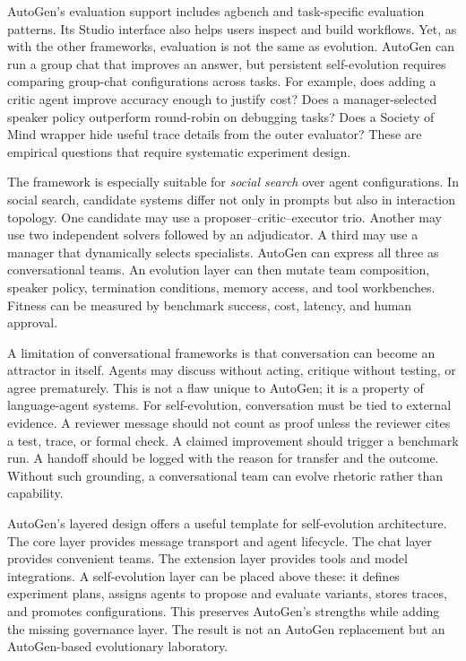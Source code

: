 AutoGen's evaluation support includes agbench and task-specific evaluation patterns.  Its Studio interface also helps users inspect and build workflows.  Yet, as with the other frameworks, evaluation is not the same as evolution.  AutoGen can run a group chat that improves an answer, but persistent self-evolution requires comparing group-chat configurations across tasks.  For example, does adding a critic agent improve accuracy enough to justify cost?  Does a manager-selected speaker policy outperform round-robin on debugging tasks?  Does a Society of Mind wrapper hide useful trace details from the outer evaluator?  These are empirical questions that require systematic experiment design.

The framework is especially suitable for \emph{social search} over agent configurations.  In social search, candidate systems differ not only in prompts but also in interaction topology.  One candidate may use a proposer--critic--executor trio.  Another may use two independent solvers followed by an adjudicator.  A third may use a manager that dynamically selects specialists.  AutoGen can express all three as conversational teams.  An evolution layer can then mutate team composition, speaker policy, termination conditions, memory access, and tool workbenches.  Fitness can be measured by benchmark success, cost, latency, and human approval.

A limitation of conversational frameworks is that conversation can become an attractor in itself.  Agents may discuss without acting, critique without testing, or agree prematurely.  This is not a flaw unique to AutoGen; it is a property of language-agent systems.  For self-evolution, conversation must be tied to external evidence.  A reviewer message should not count as proof unless the reviewer cites a test, trace, or formal check.  A claimed improvement should trigger a benchmark run.  A handoff should be logged with the reason for transfer and the outcome.  Without such grounding, a conversational team can evolve rhetoric rather than capability.

AutoGen's layered design offers a useful template for self-evolution architecture.  The core layer provides message transport and agent lifecycle.  The chat layer provides convenient teams.  The extension layer provides tools and model integrations.  A self-evolution layer can be placed above these: it defines experiment plans, assigns agents to propose and evaluate variants, stores traces, and promotes configurations.  This preserves AutoGen's strengths while adding the missing governance layer.  The result is not an AutoGen replacement but an AutoGen-based evolutionary laboratory.

